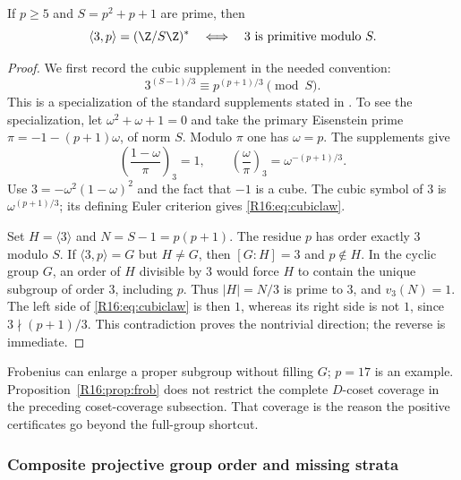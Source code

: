 \documentclass[11pt,a4paper]{article}
\theoremstyle{definition}\newtheorem{definition}[theorem]{Definition}
\theoremstyle{remark}\newtheorem{remark}[theorem]{Remark}
\begin{document}
\begin{proposition}\label{R16:prop:frob}
If $p\ge5$ and $S=p^2+p+1$ are prime, then
\[
 \langle3,p\rangle=(\Z/S\Z)^*
 \quad\Longleftrightarrow\quad
 3\text{ is primitive modulo }S.
\]
\end{proposition}
\begin{proof}
We first record the cubic supplement in the needed convention:
\begin{equation}\label{R16:eq:cubiclaw}
 3^{(S-1)/3}\equiv p^{(p+1)/3}\pmod S.
\end{equation}
This is a specialization of the standard supplements stated in
\cite[p.~291, equations (1.1)--(1.2)]{R16-Sun}. To see the specialization, let
$\omega^2+\omega+1=0$ and take the primary Eisenstein prime
$\pi=-1-(p+1)\omega$, of norm $S$. Modulo $\pi$ one has $\omega=p$.
The supplements give
\[
 \left(\frac{1-\omega}{\pi}\right)_3=1,
 \qquad
 \left(\frac{\omega}{\pi}\right)_3
      =\omega^{-(p+1)/3}.
\]
Use $3=-\omega^2(1-\omega)^2$ and the fact that $-1$ is a cube.
The cubic symbol of $3$ is $\omega^{(p+1)/3}$; its defining Euler
criterion gives \eqref{R16:eq:cubiclaw}.

Set $H=\langle3\rangle$ and $N=S-1=p(p+1)$. The residue $p$ has
order exactly $3$ modulo $S$. If $\langle3,p\rangle=G$ but $H\ne G$,
then $[G:H]=3$ and $p\notin H$. In the cyclic group $G$, an order
of $H$ divisible by $3$ would force $H$ to contain the unique subgroup
of order $3$, including $p$. Thus $|H|=N/3$ is prime to $3$, and
$v_3(N)=1$. The left side of \eqref{R16:eq:cubiclaw} is then $1$, whereas
its right side is not $1$, since $3\nmid(p+1)/3$. This contradiction
proves the nontrivial direction; the reverse is immediate.
\end{proof}

Frobenius can enlarge a proper subgroup without filling $G$; $p=17$
is an example. Proposition~\ref{R16:prop:frob} does not restrict the complete
$D$-coset coverage in the preceding coset-coverage subsection. That coverage is the reason the positive
certificates go beyond the full-group shortcut.

\subsubsection{Composite projective group order and missing strata}
\end{document}
